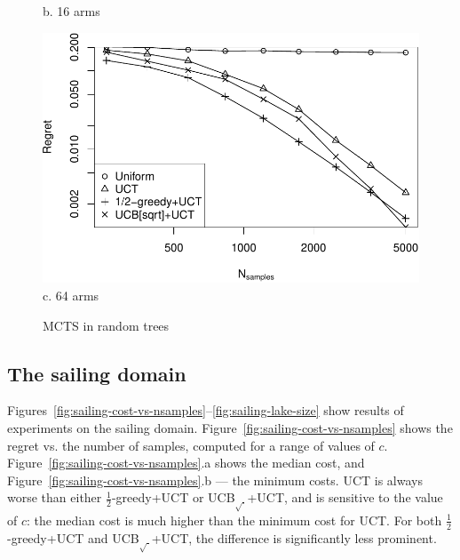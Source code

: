 \documentclass[letterpaper]{article}
\begin{document}
\begin{figure}[h!]
\begin{minipage}[c]{1.0\linewidth}
    b. 16 arms
    \vspace{0.5em}
  \end{minipage}
  \begin{minipage}[c]{1.0\linewidth}
    \centering
    \includegraphics[scale=0.45]{tree-identity-k=64-uqb=8.pdf} \\
    c. 64 arms
  \end{minipage}
  \caption{MCTS in random trees}
  \label{fig:mcts-regret}
\end{figure}

\subsection{The sailing domain}
\label{sec:emp-sailing}

Figures~\ref{fig:sailing-cost-vs-nsamples}--\ref{fig:sailing-lake-size}
show results of experiments on the sailing
domain. Figure~\ref{fig:sailing-cost-vs-nsamples} shows the regret
vs. the number of samples, computed for a range of values of
$c$. Figure~\ref{fig:sailing-cost-vs-nsamples}.a shows the median
cost, and Figure~\ref{fig:sailing-cost-vs-nsamples}.b --- the minimum
costs. UCT is always worse than either $\frac 1 2$-greedy+UCT or
UCB$_{\sqrt{\cdot}}$+UCT, and is sensitive to the value of $c$: the median cost is
much higher than the minimum cost for UCT. For both $\frac 1 2$-greedy+UCT
and UCB$_{\sqrt{\cdot}}$+UCT, the difference is significantly less prominent.
\end{document}
